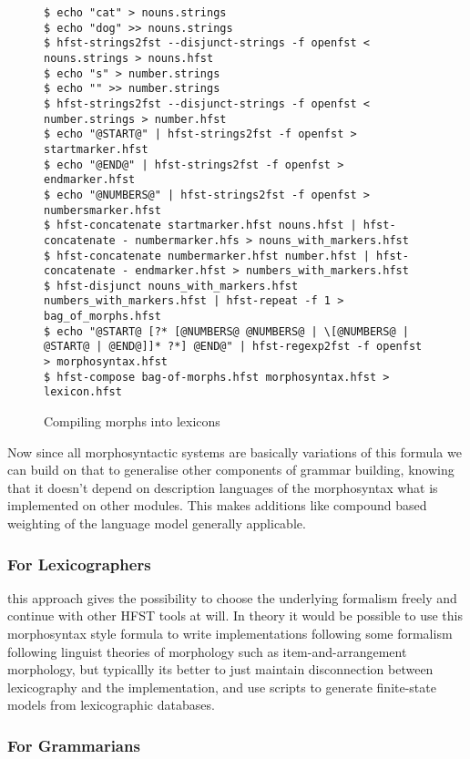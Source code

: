 \documentclass{llncs}
\begin{document}
\begin{figure} [h!]
\begin{verbatim}
$ echo "cat" > nouns.strings
$ echo "dog" >> nouns.strings
$ hfst-strings2fst --disjunct-strings -f openfst < nouns.strings > nouns.hfst
$ echo "s" > number.strings
$ echo "" >> number.strings
$ hfst-strings2fst --disjunct-strings -f openfst < number.strings > number.hfst
$ echo "@START@" | hfst-strings2fst -f openfst > startmarker.hfst
$ echo "@END@" | hfst-strings2fst -f openfst > endmarker.hfst
$ echo "@NUMBERS@" | hfst-strings2fst -f openfst > numbersmarker.hfst
$ hfst-concatenate startmarker.hfst nouns.hfst | hfst-concatenate - numbermarker.hfs > nouns_with_markers.hfst
$ hfst-concatenate numbermarker.hfst number.hfst | hfst-concatenate - endmarker.hfst > numbers_with_markers.hfst
$ hfst-disjunct nouns_with_markers.hfst numbers_with_markers.hfst | hfst-repeat -f 1 > bag_of_morphs.hfst
$ echo "@START@ [?* [@NUMBERS@ @NUMBERS@ | \[@NUMBERS@ | @START@ | @END@]]* ?*] @END@" | hfst-regexp2fst -f openfst > morphosyntax.hfst
$ hfst-compose bag-of-morphs.hfst morphosyntax.hfst > lexicon.hfst
\end{verbatim}
\caption{Compiling morphs into lexicons}
\label{fig:morphology}
\end{figure}

Now since all morphosyntactic systems are basically variations of this formula
we can build on that to generalise other components of grammar building, knowing
that it doesn't depend on description languages of the morphosyntax what is
implemented on other modules. This makes additions like compound based
weighting of the language model \cite{pirinen/2009/fsmnlp} generally
applicable.

\subsubsection{For Lexicographers} this approach gives the possibility to
choose the underlying formalism freely and continue with other HFST tools at
will. In theory it would be possible to use this morphosyntax style formula
to write implementations following some formalism following linguist
theories of morphology such as item-and-arrangement morphology, but typicallly
its better to just maintain disconnection between lexicography and the
implementation, and use scripts to generate finite-state models from
lexicographic databases.


\subsubsection{For Grammarians}
\end{document}
